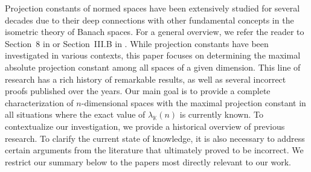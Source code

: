 \documentclass[12pt, reqno]{amsart}
\theoremstyle{definition}
\theoremstyle{remark}
\numberwithin{equation}{section}
\begin{document}
Projection constants of normed spaces have been extensively studied for several decades due to their deep connections with other fundamental concepts in the isometric theory of Banach spaces. For a general overview, we refer the reader to Section~$8$ in \cite{tomczak} or Section~III.B in \cite{wojtaszczyk}. While projection constants have been investigated in various contexts, this paper focuses on determining the maximal absolute projection constant among all spaces of a given dimension. This line of research has a rich history of remarkable results, as well as several incorrect proofs published over the years. Our main goal is to provide a complete characterization of $n$-dimensional spaces with the maximal projection constant in all situations where the exact value of $\lambda_{\mathbb{K}}(n)$ is currently known. To contextualize our investigation, we provide a historical overview of previous research. To clarify the current state of knowledge, it is also necessary to address certain arguments from the literature that ultimately proved to be incorrect. We restrict our summary below to the papers most directly relevant to our work.
\end{document}

